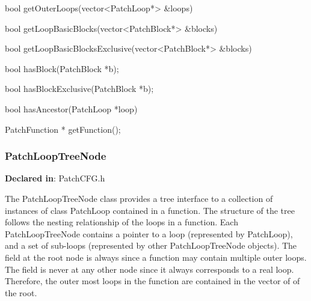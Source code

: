 \begin{apient}
bool getOuterLoops(vector<PatchLoop*> &loops)
\end{apient}

	
\begin{apient}
bool getLoopBasicBlocks(vector<PatchBlock*> &blocks)
\end{apient}

        
\begin{apient}
bool getLoopBasicBlocksExclusive(vector<PatchBlock*> &blocks)
\end{apient}
     
\begin{apient}
bool hasBlock(PatchBlock *b);
\end{apient}

\begin{apient}
bool hasBlockExclusive(PatchBlock *b);
\end{apient}

\begin{apient}
bool hasAncestor(PatchLoop *loop)
\end{apient}

\begin{apient}
PatchFunction * getFunction();
\end{apient}

\subsubsection{PatchLoopTreeNode}
\label{sec-3.2.13}

\textbf{Declared in}: PatchCFG.h

The PatchLoopTreeNode class provides a tree interface to a collection of instances of class 
PatchLoop contained in a function. The structure of the tree 
follows the nesting relationship of the loops in a function. 
Each PatchLoopTreeNode contains a pointer to a loop (represented by PatchLoop), and a set
of sub-loops (represented by other PatchLoopTreeNode objects). The  field
at the root node is always  since a function may contain multiple outer 
loops. The  field is never  at any other node since it
always corresponds to a real loop.
Therefore, the outer most loops in the function are contained in the vector of  of the root. 


